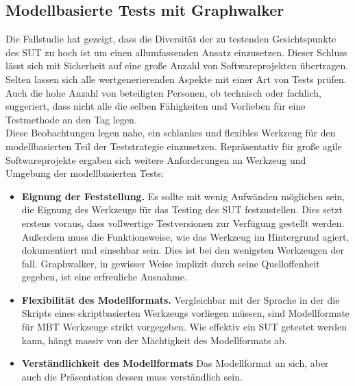\subsection{Modellbasierte Tests mit Graphwalker}
\label{sec:mbt_results}
Die Fallstudie hat gezeigt, dass die Diversität der zu testenden Gesichtspunkte des \Gls{SUT} zu hoch ist um einen allumfassenden Ansatz einzusetzen. Dieser Schluss lässt sich mit Sicherheit auf eine große Anzahl von Softwareprojekten übertragen. Selten lassen sich alle wertgenerierenden Aspekte mit einer Art von Tests prüfen. Auch die hohe Anzahl von beteiligten Personen, ob technisch oder fachlich, suggeriert, dass nicht alle die selben Fähigkeiten und Vorlieben für eine Testmethode an den Tag legen.\\
Diese Beobachtungen legen nahe, ein schlankes und flexibles Werkzeug für den modellbasierten Teil der Teststrategie einzusetzen. Repräsentativ für große agile Softwareprojekte ergaben sich weitere Anforderungen an Werkzeug und Umgebung der modellbasierten Tests:

\begin{itemize} 
\item\textbf{Eignung der Feststellung.} Es sollte mit wenig Aufwänden möglichen sein, die Eignung des Werkzeugs für das Testing des \Gls{SUT} festzustellen. Dies setzt erstens voraus, dass vollwertige Testversionen zur Verfügung gestellt werden. Außerdem muss die Funktionsweise, wie das Werkzeug im Hintergrund agiert, dokumentiert und einsehbar sein. Dies ist bei den wenigsten Werkzeugen der fall. Graphwalker, in gewisser Weise implizit durch seine Quelloffenheit gegeben, ist eine erfreuliche Ausnahme.
\item \textbf{Flexibilität des Modellformats.} Vergleichbar mit der Sprache in der die Skripts eines skriptbasierten Werkzeugs vorliegen müssen, sind Modellformate für \Gls{MBT} Werkzeuge strikt vorgegeben. Wie effektiv ein \Gls{SUT} getestet werden kann, hängt massiv von der Mächtigkeit des Modellformats ab.
\item \textbf{Verständlichkeit des Modellformats} Das Modellformat an sich, aber auch die Präsentation dessen muss verständlich sein.
\end{itemize}


